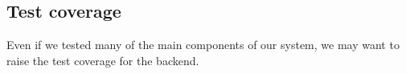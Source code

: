 


\subsection{Test coverage}
Even if we tested many of the main components of our system, we may want to
raise the test coverage for the backend.

